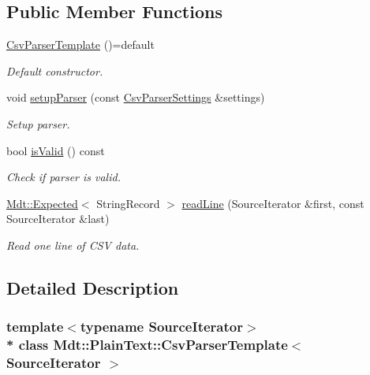 \subsection*{Public Member Functions}
\begin{DoxyCompactItemize}
\item 
\hyperlink{class_mdt_1_1_plain_text_1_1_csv_parser_template_a0365862918b7ffb5e70bfd2fd6a0e95e}{Csv\+Parser\+Template} ()=default\hypertarget{class_mdt_1_1_plain_text_1_1_csv_parser_template_a0365862918b7ffb5e70bfd2fd6a0e95e}{}\label{class_mdt_1_1_plain_text_1_1_csv_parser_template_a0365862918b7ffb5e70bfd2fd6a0e95e}

\begin{DoxyCompactList}\small\item\em Default constructor. \end{DoxyCompactList}\item 
void \hyperlink{class_mdt_1_1_plain_text_1_1_csv_parser_template_a95c35ee9721efec0aedcf8b18b310001}{setup\+Parser} (const \hyperlink{class_mdt_1_1_plain_text_1_1_csv_parser_settings}{Csv\+Parser\+Settings} \&settings)
\begin{DoxyCompactList}\small\item\em Setup parser. \end{DoxyCompactList}\item 
bool \hyperlink{class_mdt_1_1_plain_text_1_1_csv_parser_template_a215191b75041f462135572f328669731}{is\+Valid} () const 
\begin{DoxyCompactList}\small\item\em Check if parser is valid. \end{DoxyCompactList}\item 
\hyperlink{class_mdt_1_1_expected}{Mdt\+::\+Expected}$<$ String\+Record $>$ \hyperlink{class_mdt_1_1_plain_text_1_1_csv_parser_template_aa6a88c11fa8def4ee7fd3437d9099a95}{read\+Line} (Source\+Iterator \&first, const Source\+Iterator \&last)
\begin{DoxyCompactList}\small\item\em Read one line of C\+SV data. \end{DoxyCompactList}\end{DoxyCompactItemize}


\subsection{Detailed Description}
\subsubsection*{template$<$typename Source\+Iterator$>$\\*
class Mdt\+::\+Plain\+Text\+::\+Csv\+Parser\+Template$<$ Source\+Iterator $>$}

